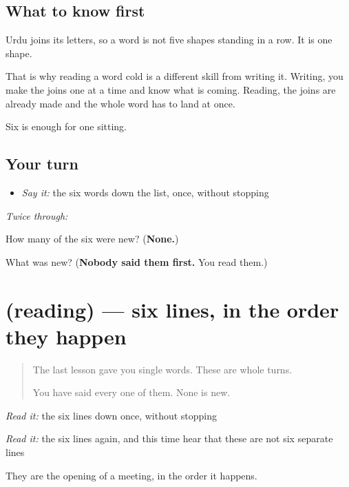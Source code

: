 \subsection*{What to know first}
Urdu joins its letters, so a word is not five shapes standing in a row. It is one shape.

That is why reading a word cold is a different skill from writing it. Writing, you make the joins one at a time and know what is coming. Reading, the joins are already made and the whole word has to land at once.

Six is enough for one sitting.

\subsection*{Your turn}
\begin{itemize}
\raggedright
  \item \emph{Say it:} the six words down the list, once, without stopping
\end{itemize}

\emph{Twice through:}

\begin{tcolorbox}[breakable,colback=teal!4,colframe=teal!35!black,title={Before you move on}]
How many of the six were new? (\textbf{None.})

What was new? (\textbf{Nobody said them first.} You read them.)
\end{tcolorbox}
\section[(reading)]{(reading) — six lines, in the order they happen}

\label{lesson:UR-C33-lines}



\begin{quote}
The last lesson gave you single words. These are whole turns.

You have said every one of them. None is new.
\end{quote}

\begin{tcolorbox}[breakable,skin=enhanced,colback=orange!6,colframe=orange!45!black,boxrule=0.5pt,arc=1mm,left=6pt,right=6pt,top=4pt,bottom=4pt,fonttitle=\bfseries,title={Read this}]
\begin{quote}
             
\end{quote}

\emph{Read it:} the six lines down once, without stopping

\emph{Read it:} the six lines again, and this time hear that these are not six separate lines

They are the opening of a meeting, in the order it happens.
\end{tcolorbox}

